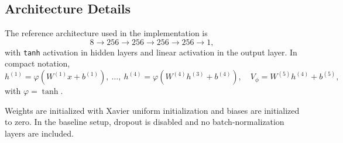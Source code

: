 \subsection{Architecture Details}

The reference architecture used in the implementation is
\[
8 \rightarrow 256 \rightarrow 256 \rightarrow 256 \rightarrow 256 \rightarrow 1,
\]
with \texttt{tanh} activation in hidden layers and linear activation in the output layer. In compact notation,
\[
h^{(1)}=\varphi(W^{(1)}x+b^{(1)}),\ \dots,\
h^{(4)}=\varphi(W^{(4)}h^{(3)}+b^{(4)}),\quad
V_\phi=W^{(5)}h^{(4)}+b^{(5)},
\]
with $\varphi=\tanh$.

Weights are initialized with Xavier uniform initialization and biases are initialized to zero. In the baseline setup, dropout is disabled and no batch-normalization layers are included.

